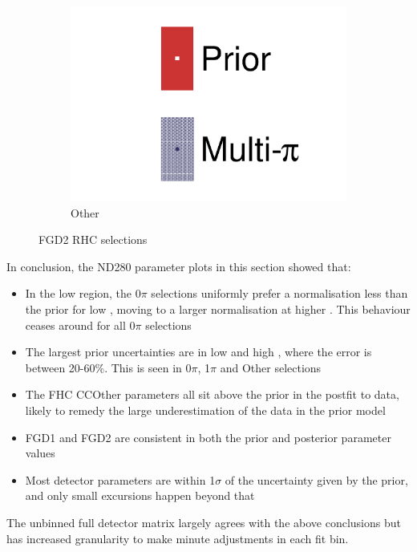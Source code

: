 \begin{figure}[h]
\begin{subfigure}[t]{0.32\textwidth}
		\includegraphics[width=\textwidth,page=57, trim={0mm 0mm 0mm 0mm}, clip]{figures/mach3/2018/data/2018a_FixedCov_RedCov_Mpi_Data_merge_drawPar_withDet}
		\caption{Other}
	\end{subfigure}
	\caption{FGD2 \numu RHC selections}
	\label{fig:data_multipi_det_fdg2_numuRHC}
\end{figure}

In conclusion, the ND280 parameter plots in this section showed that:
\begin{itemize}
	\item In the low \cosmu region, the 0$\pi$ selections uniformly prefer a normalisation less than the prior for low \pmu, moving to a larger normalisation at higher \pmu. This behaviour ceases around  for all 0$\pi$ selections
	\item The largest prior uncertainties are in low \cosmu and high \pmu, where the error is between 20-60\%. This is seen in 0$\pi$, 1$\pi$ and Other selections
	\item The FHC \numu CCOther parameters all sit above the prior in the postfit to data, likely to remedy the large underestimation of the data in the prior model
	\item FGD1 and FGD2 are consistent in both the prior and posterior parameter values
	\item Most detector parameters are within 1$\sigma$ of the uncertainty given by the prior, and only small excursions happen beyond that
\end{itemize}
The unbinned full detector matrix largely agrees with the above conclusions but has increased granularity to make minute adjustments in each fit bin.

